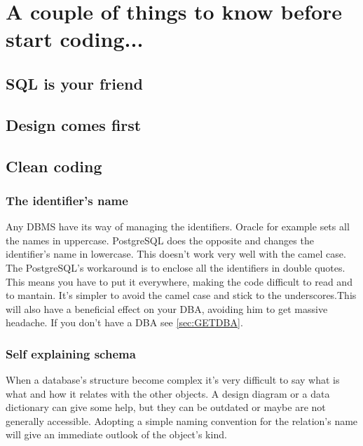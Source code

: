 \chapter{A couple of things to know before start coding...}
\label{cha:COUPLETHINGS}
\section{SQL is your friend}
\section{Design comes first}
\section{Clean coding}
\subsection{The identifier's name}
Any DBMS have its way of managing the identifiers. Oracle for example sets all the names in 
uppercase. PostgreSQL does the opposite and changes the identifier's name in  lowercase. This 
doesn't work very well with the camel case. The PostgreSQL's workaround is to enclose 
all the identifiers in double quotes. This means you have to put it everywhere, making the code 
difficult to read and to mantain. It's simpler to avoid the camel case and stick to the 
underscores.This will also have a beneficial effect on your DBA, avoiding him to get massive 
headache. If you don't have a DBA see \ref{sec:GETDBA}.

\subsection{Self explaining schema}
When a database's structure become complex it's very difficult to say what is what and how 
it relates with the other objects. A design diagram or a data dictionary can give some help, but 
they can be outdated or maybe are not generally accessible. Adopting a simple naming convention for 
the relation's name will give an immediate outlook of the object's kind.\newline


